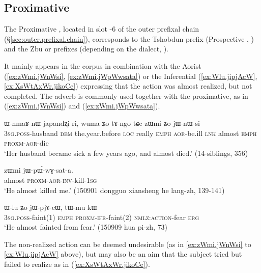 \subsection{Proximative} \label{sec:proximative}
The Proximative , located in slot -6 of the outer prefixal chain (§\ref{sec:outer.prefixal.chain}), corresponds to the Tshobdun  prefix (Prospective , \citealt[142–143]{sun08shiti}) and the Zbu  or  prefixes (depending on the dialect, \citealt[9;201-202]{gong18these}).

It mainly appears in the corpus in combination with the Aorist (\ref{ex:zWmi.jWnWsi}, \ref{ex:zWmi.jWpWwsata}) or the Inferential (\ref{ex:Wlu.jipjAcW}, \ref{ex:XsWtAxWr.jikoCe}) expressing that the action was almost realized, but not completed. The adverb  is commonly used together with the proximative, as in (\ref{ex:zWmi.jWnWsi}) and (\ref{ex:zWmi.jWpWwsata}).

\begin{exe}
\ex \label{ex:zWmi.jWnWsi}
\gll ɯ-nmaʁ nɯ japandʐi ri, wuma ʑo tɤ-ngo tɕe zɯmi ʑo jɯ-nɯ-si \\
\textsc{3sg}.\textsc{poss}-husband \textsc{dem} the.year.before \textsc{loc} really \textsc{emph} \textsc{aor}-be.ill \textsc{lnk} almost \textsc{emph}  \textsc{proxm}-\textsc{aor}-die \\
\glt `Her husband became sick a few years ago, and almost died.' (14-siblings, 356)
  \end{exe}
  
  \begin{exe}
\ex \label{ex:zWmi.jWpWwsata}
\gll zɯmi jɯ-pɯ́-wɣ-sat-a. \\
almost \textsc{proxm}-\textsc{aor}-\textsc{inv}-kill-\textsc{1sg} \\
\glt `He almost killed me.' (150901 dongguo xiansheng he lang-zh, 139-141)
 \end{exe} 
 
\begin{exe}
\ex \label{ex:Wlu.jipjAcW}
\gll ɯ-lu ʑo jɯ-pjɤ-cɯ, tɯ-mu kɯ \\
\textsc{3sg}.\textsc{poss}-faint(1) \textsc{emph} \textsc{proxm}-\textsc{ifr}-faint(2) \textsc{nmlz}:\textsc{action}-fear \textsc{erg} \\
\glt `He almost fainted from fear.' (150909 hua pi-zh, 73)
\end{exe}

The non-realized action can be deemed undesirable (as in \ref{ex:zWmi.jWnWsi} to \ref{ex:Wlu.jipjAcW} above), but may also be an aim that the subject tried but failed to realize as in (\ref{ex:XsWtAxWr.jikoCe}).

